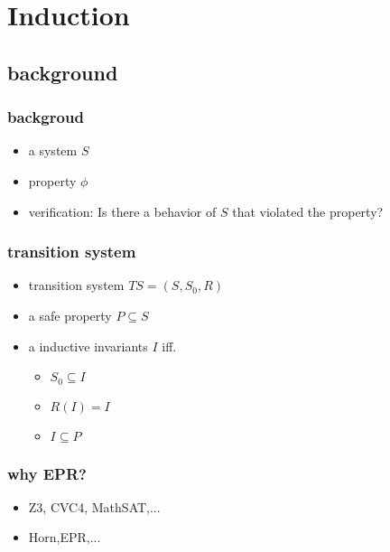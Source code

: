 \section{Induction}
\subsection{background}
\begin{frame}
    \frametitle{backgroud}
    \begin{itemize}
        \item a system $S$
        \item property $\phi$
        \item verification: Is there a behavior of $S$ that violated the property?
    \end{itemize}
\end{frame}
\begin{frame}
    \frametitle{transition system}
    \begin{itemize}
        \item transition system $TS=(S,S_{0},R)$
        \item a safe property $P\subseteq S$
        \item a inductive invariants $I$ iff.
        \begin{itemize}
            \item $S_{0}\subseteq I$
            \item $R(I)=I$
            \item $I\subseteq P$
        \end{itemize}
    \end{itemize}
\end{frame}

\begin{frame}
    \frametitle{why EPR?}
    \begin{itemize}
        \item Z3, CVC4, MathSAT,...
        \item Horn,EPR,...




    \end{itemize}
\end{frame}


